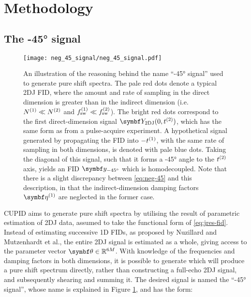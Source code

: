 \section{Methodology}
\subsection{The \ang{-45} signal}
\begin{figure}
    \centering
    \texttt{[image: neg\_45\_signal/neg\_45\_signal.pdf]}
    \caption[
        An illustration of the reasoning behind the name ``\ang{-45}
        signal'' used to generate pure shift spectra.
    ]{
        An illustration of the reasoning behind the name ``\ang{-45}
        signal'' used to generate pure shift spectra. The pale red dots denote
        a typical \ac{2DJ} \ac{FID}, where
        the amount and rate of sampling in the direct dimension is greater than
        in the indirect dimension (i.e. $N^{(1)} \ll N^{(2)}$ and $f_{\mathrm{sw}}^{(1)} \ll
        f_{\mathrm{sw}}^{(2)}$). The bright red dots correspond to the first direct-dimension
        signal $\bY_{\text{2DJ}}(0, \ttwo)$, which has the same form as
         from a pulse-acquire experiment. A hypothetical signal
        generated by propagating the \ac{FID} into $-t^{(1)}$, with the same rate
        of sampling in both dimensions, is denoted with pale blue dots. Taking
        the diagonal of this signal, such that it forms a \ang{-45} angle to the
        $t^{(2)}$ axis, yields an \ac{FID} $\by_{\ang{-45}}$  which is
        homodecoupled. Note that there is a slight discrepancy
        between \eqref{eq:neg-45} and this description, in that the
        indirect-dimension damping factors $\bdetaone$ are neglected in the
        former case.
    }
    \label{fig:neg-45}
\end{figure}
\ac{CUPID} aims to generate pure shift spectra by utilising the result of
parametric estimation of \ac{2DJ} data, assumed to take the functional form of
\eqref{eq:jres-fid}.
Instead of estimating successive \ac{1D} \acp{FID}, as proposed by
Nuzillard and Mutzenhardt et al., the entire \ac{2DJ} signal is estimated as a
whole, giving access to the parameter vector $\bth \in \mathbb{R}^{6M}$. With
knowledge of the frequencies and damping factors in both dimensions, it is
possible to generate  which will produce a pure shift spectrum
directly, rather than constructing a full-echo \ac{2DJ} signal, and
subsequently shearing and summing it. The desired signal is named
the ``\ang{-45} signal'', whose name is explained in Figure \ref{fig:neg-45},
and has the form:

